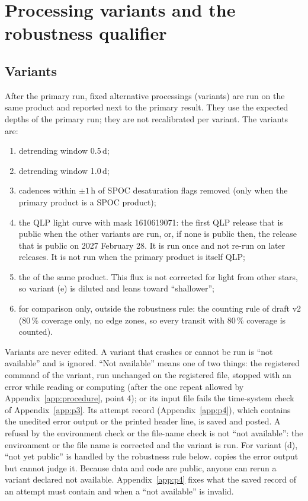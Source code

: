 \section{Processing variants and the robustness qualifier} \label{app:variants}

\subsection{Variants}

After the primary run, fixed alternative processings (variants) are run on the same product and reported next to the
primary result. They use the expected depths of the primary run; they are not recalibrated per variant. The variants
are:
\begin{enumerate}[label=(\alph*)]
\item detrending window 0.5\,d;
\item detrending window 1.0\,d;
\item cadences within $\pm 1$\,h of SPOC desaturation flags removed (only when the primary product is a SPOC product);
\item the QLP light curve with mask 1610619071: the first QLP release that is public when the other variants are run,
  or, if none is public then, the release that is public on 2027 February 28. It is run once and not re-run on later
  releases. It is not run when the primary product is itself QLP;
\item the  of the same product. This flux is not corrected for light from other stars, so variant (e)
  is diluted and leans toward ``shallower'';
\item for comparison only, outside the robustness rule: the counting rule of draft v2 (80\,\% coverage only, no edge
  zones, so every transit with 80\,\% coverage is counted).
\end{enumerate}

Variants are never edited. A variant that crashes or cannot be run is ``not available'' and is ignored. ``Not
available'' means one of two things: the registered command of the variant, run unchanged on the registered file,
stopped with an error while reading or computing (after the one repeat allowed by Appendix~\ref{app:procedure}, point
4); or its input file fails the time-system check of Appendix~\ref{app:p3}. Its attempt record
(Appendix~\ref{app:p4}), which contains the unedited error output or the printed header line, is saved and posted. A
refusal by the environment check or the file-name check is not ``not available'': the environment or the file name is
corrected and the variant is run. For variant (d), ``not yet public'' is handled by the robustness rule below.
 copies the error output but cannot judge it. Because data and code are public, anyone can rerun
a variant declared not available. Appendix~\ref{app:p4} fixes what the saved record of an attempt must contain and when
a ``not available'' is invalid.

